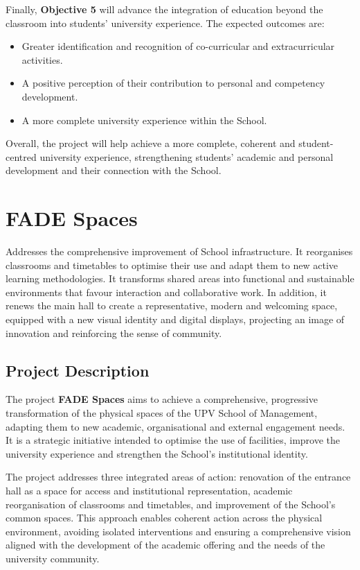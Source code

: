 \documentclass[11pt,a4paper]{scrreprt}
\begin{document}
Finally, \textbf{Objective 5} will advance the integration of education beyond the classroom into students' university experience. The expected outcomes are:
\begin{itemize}[noitemsep,topsep=2pt]
\item Greater identification and recognition of co-curricular and extracurricular activities.
\item A positive perception of their contribution to personal and competency development.
\item A more complete university experience within the School.
\end{itemize}

Overall, the project will help achieve a more complete, coherent and student-centred university experience, strengthening students' academic and personal development and their connection with the School.

\chapter[FADE Spaces]{\textcolor{espcolor}{FADE Spaces}}
\begin{tcolorbox}[descbox]
\small Addresses the comprehensive improvement of School infrastructure. It reorganises classrooms and timetables to optimise their use and adapt them to new active learning methodologies. It transforms shared areas into functional and sustainable environments that favour interaction and collaborative work. In addition, it renews the main hall to create a representative, modern and welcoming space, equipped with a new visual identity and digital displays, projecting an image of innovation and reinforcing the sense of community.
\end{tcolorbox}

\section{Project Description}

\small
The project \textbf{FADE Spaces} aims to achieve a comprehensive, progressive transformation of the physical spaces of the UPV School of Management, adapting them to new academic, organisational and external engagement needs. It is a strategic initiative intended to optimise the use of facilities, improve the university experience and strengthen the School's institutional identity.

The project addresses three integrated areas of action: renovation of the entrance hall as a space for access and institutional representation, academic reorganisation of classrooms and timetables, and improvement of the School's common spaces. This approach enables coherent action across the physical environment, avoiding isolated interventions and ensuring a comprehensive vision aligned with the development of the academic offering and the needs of the university community.
\end{document}
